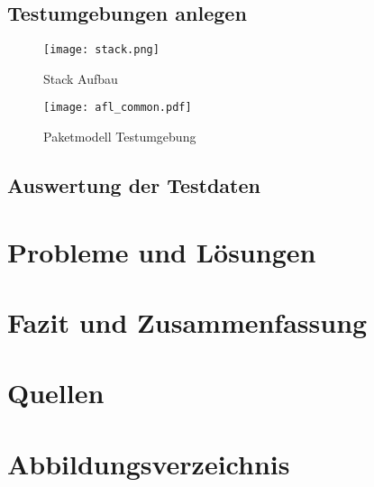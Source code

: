\documentclass[12pt,a4paper]{scrreprt}
\begin{document}
\newpage
\section{Testumgebungen anlegen}

\begin{figure}[htbp] 
  \centering
     \texttt{[image: stack.png]}
  \caption{Stack Aufbau}
  \label{fig:Bild3}
\end{figure}


\begin{figure}[htbp] 
  \centering
     \texttt{[image: afl\_common.pdf]}
  \caption{Paketmodell Testumgebung}
  \label{fig:Bild4}
\end{figure}





\newpage
\section{Auswertung der Testdaten}


\newpage
\chapter{Probleme und Lösungen}

\chapter{Fazit und Zusammenfassung}

\chapter{Quellen}


\chapter{Abbildungsverzeichnis}
\listoffigures	
	
\end{document}
